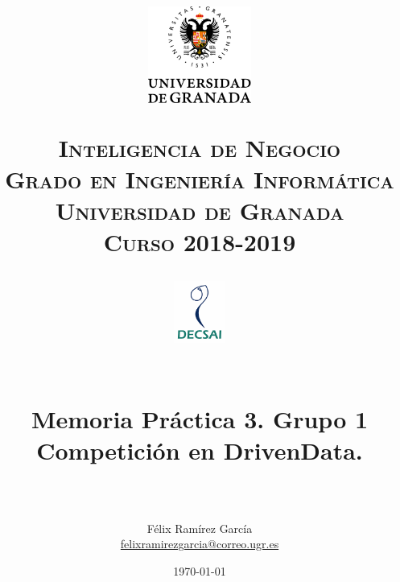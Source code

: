 
\usepackage{url}

\title{	
	\normalfont \normalsize
	\begin{figure}[htb]
		\centering
		\includegraphics[width=0.3\textwidth]{./imagenes/1}
	\end{figure}
	\textsc{\textbf{Inteligencia de Negocio} \\ Grado en Ingeniería Informática \\ Universidad de Granada \\
	Curso 2018-2019} \\ [25pt] %
	\begin{figure}[htb]
		\centering
		\includegraphics[width=0.15\textwidth]{./imagenes/2}
	\end{figure}
	\horrule{0.5pt} \\[0.4cm] %
	\huge Memoria Práctica 3. Grupo 1 \\
	\huge Competición en DrivenData.
	\\ %
	\horrule{2pt} \\[0.5cm] %
}
\author{Félix Ramírez García  \\
\href{mailto:felixramirezgarcia@correo.ugr.es}{felixramirezgarcia@correo.ugr.es}} %
\date{\normalsize\today} %



	
	\maketitle %
	
